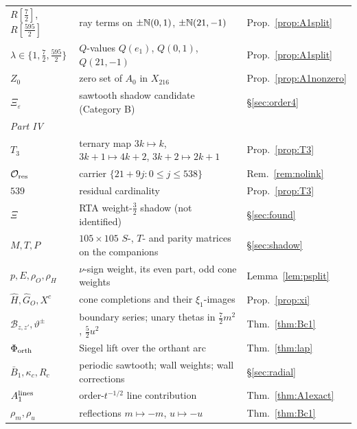 \begin{center}
\begin{longtable}{p{3.2cm}p{9.3cm}p{2.4cm}}
$R[\frac72]$, $R[\frac{595}2]$ & ray terms on $\pm\mathbb{N}(0,1)$, $\pm\mathbb{N}(21,-1)$ & Prop.~\ref{prop:A1split}\\
$\lambda\in\{1,\frac72,\frac{595}2\}$ & $Q$-values $Q(e_1)$, $Q(0,1)$, $Q(21,-1)$ & Prop.~\ref{prop:A1split}\\
$Z_0$ & zero set of $A_0$ in $X_{216}$ & Prop.~\ref{prop:A1nonzero}\\
$\Xi_\varepsilon$ & sawtooth shadow candidate (Category B) & \S\ref{sec:order4}\\
\multicolumn{3}{l}{\emph{Part IV}}\\
$T_3$ & ternary map $3k\mapsto k$, $3k{+}1\mapsto4k{+}2$, $3k{+}2\mapsto2k{+}1$ & Prop.~\ref{prop:T3}\\
$\mathcal O_{\rm res}$ & carrier $\{21+9j:0\le j\le538\}$ & Rem.~\ref{rem:nolink}\\
$539$ & residual cardinality & Prop.~\ref{prop:T3}\\
$\Xi$ & RTA weight-$\frac32$ shadow (not identified) & \S\ref{sec:found}\\
$M,T,P$ & $105\times105$ $S$-, $T$- and parity matrices on the companions & \S\ref{sec:shadow}\\
$p,E,\rho_O,\rho_H$ & $\nu$-sign weight, its even part, odd cone weights & Lemma~\ref{lem:psplit}\\
$\widehat H,\widehat G_O,X^c$ & cone completions and their $\xi_1$-images & Prop.~\ref{prop:xi}\\
$\mathcal B_{z,z'},\vartheta^\pm$ & boundary series; unary thetas in $\frac72m^2$, $\frac52u^2$ & Thm.~\ref{thm:Bc1}\\
$\Phi_{\rm orth}$ & Siegel lift over the orthant arc & Thm.~\ref{thm:lap}\\
$\bar B_1,\kappa_c,R_c$ & periodic sawtooth; wall weights; wall corrections & \S\ref{sec:radial}\\
$A_1^{\rm lines}$ & order-$t^{-1/2}$ line contribution & Thm.~\ref{thm:A1exact}\\
$\rho_m,\rho_u$ & reflections $m\mapsto-m$, $u\mapsto-u$ & Thm.~\ref{thm:Bc1}\\
\bottomrule
\end{longtable}
\end{center}
\clearpage
